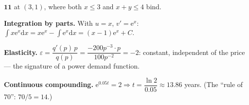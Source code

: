 \begin{solutions}
        $\mathbf{11}$ at $(3,1)$, where both $x\le3$ and $x+y\le4$ bind.
  \item \textbf{Integration by parts.} With $u=x$,
        $v'=\mathrm{e}^{x}$:
        $\int x\mathrm{e}^{x}\mathrm{d}x
        =x\mathrm{e}^{x}-\int\mathrm{e}^{x}\mathrm{d}x
        =(x-1)\mathrm{e}^{x}+C$.
  \item \textbf{Elasticity.}
        $\varepsilon=\dfrac{q'(p)\,p}{q(p)}
        =\dfrac{-200p^{-3}\cdot p}{100p^{-2}}=-2$: constant, independent of
        the price --- the signature of a power demand function.
  \item \textbf{Continuous compounding.}
        $\mathrm{e}^{0.05t}=2\Rightarrow t=\dfrac{\ln2}{0.05}
        \approx13.86$ years. (The ``rule of $70$'': $70/5=14$.)
\end{solutions}
